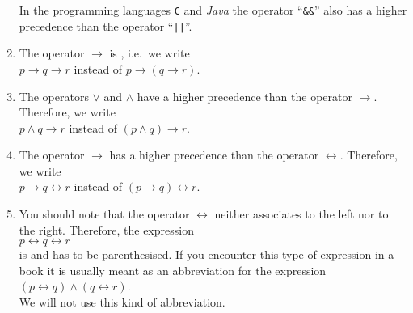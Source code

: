 \begin{enumerate}
      In the programming languages  \texttt{C} and \textsl{Java} the operator ``\texttt{\&\&}'' also has a higher
      precedence than the operator ``\texttt{||}''. 
\item The operator $\rightarrow$ is \underline{}\underline{}, i.e.~we write \\[0.2cm]
      \hspace*{1.3cm} $p \rightarrow q \rightarrow r$ \quad instead of \quad $p \rightarrow (q \rightarrow r)$.
\item The operators  $\vee$ and $\wedge$ have a higher precedence than the operator $\rightarrow$.  Therefore,
      we write \\[0.2cm]
      \hspace*{1.3cm} $p \wedge q \rightarrow r$ \quad instead of \quad $(p \wedge q) \rightarrow r$.
\item The operator $\rightarrow$ has a higher precedence than the operator $\leftrightarrow$.  Therefore, we write \\[0.2cm]
      \hspace*{1.3cm} $p \rightarrow q \leftrightarrow r$ \quad instead of \quad $(p \rightarrow q) \leftrightarrow
      r$.
\item You should note that the operator $\leftrightarrow$ neither associates to the left nor to the right.
      Therefore, the expression
      \\[0.2cm]
      \hspace*{1.3cm}
      $p \leftrightarrow q \leftrightarrow r$
      \\[0.2cm]
      is \underline{\textbf{}} and has to be parenthesised.  If you encounter this type of expression
      in a book it is usually meant as an abbreviation for the expression
      \\[0.2cm]
      \hspace*{1.3cm}
      $(p \leftrightarrow q) \wedge (q \leftrightarrow r)$.
      \\[0.2cm]
      We will not use this kind of abbreviation.
\end{enumerate}

